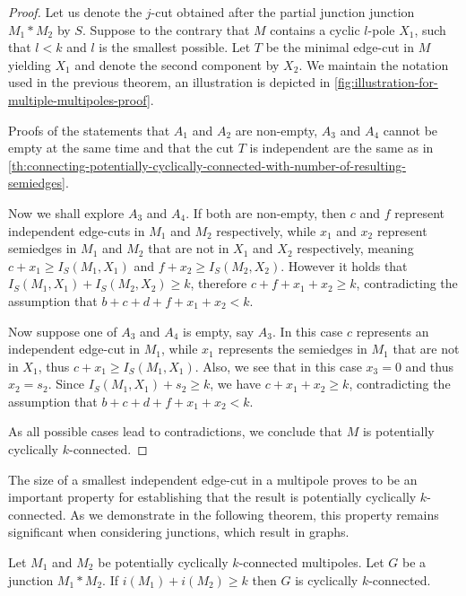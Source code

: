 \documentclass[12pt, twoside]{book}
\begin{document}
\begin{proof}
	Let us denote the $j$-cut obtained after the partial junction junction $M_1*M_2$ by $S$. Suppose to the contrary that $M$ contains a cyclic $l$-pole $X_1$, such that $l<k$ and $l$ is the smallest possible. Let $T$ be the minimal edge-cut in $M$ yielding $X_1$ and denote the second component by $X_2$. We maintain the notation used in the previous theorem, an illustration is depicted in \cref{fig:illustration-for-multiple-multipoles-proof}.
	
	Proofs of the statements that $A_1$ and $A_2$ are non-empty, $A_3$ and $A_4$ cannot be empty at the same time and that the cut $T$ is independent are the same as in \cref{th:connecting-potentially-cyclically-connected-with-number-of-resulting-semiedges}.
	
	Now we shall explore $A_3$ and $A_4$. If both are non-empty, then $c$ and $f$ represent independent edge-cuts in $M_1$ and $M_2$ respectively, while $x_1$ and $x_2$ represent semiedges in $M_1$ and $M_2$ that are not in $X_1$ and $X_2$ respectively, meaning ${c+x_1\geq I_S(M_1, X_1)}$ and ${f+x_2\geq I_S(M_2, X_2)}$. However it holds that ${I_S(M_1, X_1)+I_S(M_2, X_2)\geq k}$, therefore $c+f+x_1+x_2\geq k$, contradicting the assumption that ${b+c+d+f+x_1+x_2<k}$.
	
	Now suppose one of $A_3$ and $A_4$ is empty, say $A_3$. In this case $c$ represents an independent edge-cut in $M_1$, while $x_1$ represents the semiedges in $M_1$ that are not in $X_1$, thus ${c+x_1\geq I_S(M_1, X_1)}$. Also, we see that in this case $x_3=0$ and thus $x_2=s_2$. Since ${I_S(M_1, X_1)+s_2\geq k}$, we have $c+x_1+x_2\geq k$, contradicting the assumption that ${b+c+d+f+x_1+x_2<k}$.
	
	As all possible cases lead to contradictions, we conclude that $M$ is potentially cyclically \mbox{$k$-connected}.
\end{proof}

The size of a smallest independent edge-cut in a multipole proves to be an important property for establishing that the result is potentially cyclically $k$-connected. As we demonstrate in the following theorem, this property remains significant when considering junctions, which result in graphs.

\begin{theorem}\label{th:cyclic-edge-connectivity-of-potentially-with-independent-cuts}
	Let $M_1$ and $M_2$ be potentially cyclically $k$-connected multipoles. Let $G$ be a junction $M_1*M_2$. If $i(M_1)+i(M_2)\geq k$ then $G$ is cyclically $k$-connected.
\end{theorem}
\end{document}
